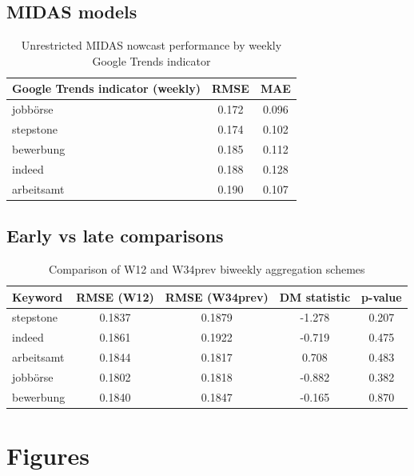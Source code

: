 \documentclass[12pt,a4paper]{article}
\begin{document}
\subsection{MIDAS models}
\begin{table}[htbp]
\centering
\caption{Unrestricted MIDAS nowcast performance by weekly Google Trends indicator}
\label{tab:midas_keywords}
\begin{tabular}{l c c}
\toprule
Google Trends indicator (weekly) & RMSE  & MAE   \\
\midrule
jobbörse   & 0.172 & 0.096 \\
stepstone  & 0.174 & 0.102 \\
bewerbung  & 0.185 & 0.112 \\
indeed     & 0.188 & 0.128 \\
arbeitsamt & 0.190 & 0.107 \\
\bottomrule
\end{tabular}
\end{table}


\subsection{Early vs late comparisons}
\begin{table}[ht!]
\centering
\caption{Comparison of W12 and W34prev biweekly aggregation schemes}
\label{tab:w12_w34_comparison}
\begin{tabular}{lcccc}
\toprule
\textbf{Keyword} & \textbf{RMSE (W12)} & \textbf{RMSE (W34prev)} & \textbf{DM statistic} & \textbf{p-value} \\
\midrule
stepstone   & 0.1837 & 0.1879 &  -1.278 & 0.207 \\
indeed      & 0.1861 & 0.1922 &  -0.719 & 0.475 \\
arbeitsamt  & 0.1844 & 0.1817 &   0.708 & 0.483 \\
jobbörse    & 0.1802 & 0.1818 &  -0.882 & 0.382 \\
bewerbung   & 0.1840 & 0.1847 &  -0.165 & 0.870 \\
\bottomrule
\end{tabular}
\end{table}












\newpage
\section{Figures}
\end{document}
